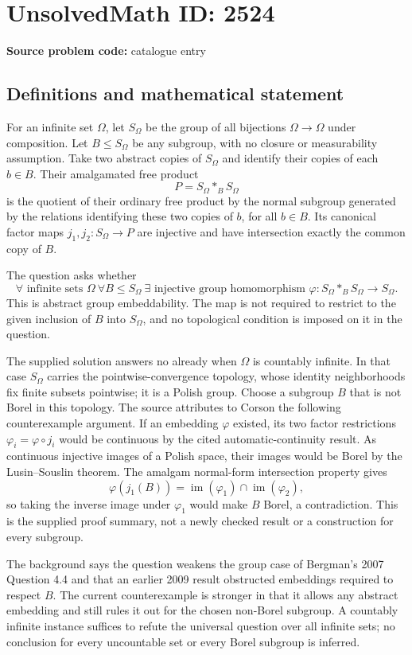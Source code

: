 \documentclass[11pt]{article}
\begin{document}
\section*{UnsolvedMath ID: 2524}
\textbf{Source problem code:} catalogue entry
\subsection{Definitions and mathematical statement}
For an infinite set $\Omega$, let $S_\Omega$ be the group of all bijections $\Omega\to\Omega$ under composition. Let $B\leq S_\Omega$ be any subgroup, with no closure or measurability assumption. Take two abstract copies of $S_\Omega$ and identify their copies of each $b\in B$. Their amalgamated free product
\[
P=S_\Omega*_B S_\Omega
\]
is the quotient of their ordinary free product by the normal subgroup generated by the relations identifying these two copies of $b$, for all $b\in B$. Its canonical factor maps $j_1,j_2:S_\Omega\to P$ are injective and have intersection exactly the common copy of $B$.

The question asks whether
\[
\forall\text{ infinite sets }\Omega\ \forall B\leq S_\Omega\ \exists\text{ injective group homomorphism }
\varphi:S_\Omega*_B S_\Omega\longrightarrow S_\Omega.
\]
This is abstract group embeddability. The map is not required to restrict to the given inclusion of $B$ into $S_\Omega$, and no topological condition is imposed on it in the question.

The supplied solution answers no already when $\Omega$ is countably infinite. In that case $S_\Omega$ carries the pointwise-convergence topology, whose identity neighborhoods fix finite subsets pointwise; it is a Polish group. Choose a subgroup $B$ that is not Borel in this topology. The source attributes to Corson the following counterexample argument. If an embedding $\varphi$ existed, its two factor restrictions $\varphi_i=\varphi\circ j_i$ would be continuous by the cited automatic-continuity result. As continuous injective images of a Polish space, their images would be Borel by the Lusin--Souslin theorem. The amalgam normal-form intersection property gives
\[
\varphi(j_1(B))=\operatorname{im}(\varphi_1)\cap\operatorname{im}(\varphi_2),
\]
so taking the inverse image under $\varphi_1$ would make $B$ Borel, a contradiction. This is the supplied proof summary, not a newly checked result or a construction for every subgroup.

The background says the question weakens the group case of Bergman's 2007 Question 4.4 and that an earlier 2009 result obstructed embeddings required to respect $B$. The current counterexample is stronger in that it allows any abstract embedding and still rules it out for the chosen non-Borel subgroup. A countably infinite instance suffices to refute the universal question over all infinite sets; no conclusion for every uncountable set or every Borel subgroup is inferred.
\end{document}
